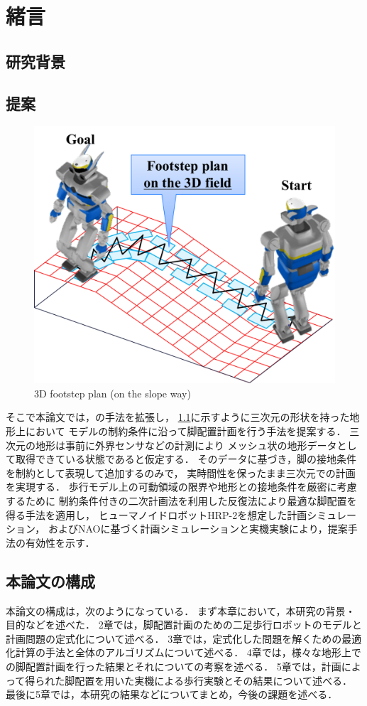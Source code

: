 \documentclass[autodetect-engine,dvipdfmx-if-dvi,ja=standard,a4j,jbase=11pt,magstyle=nomag*]{bxjsreport}
\begin{document}
\chapter{緒言}

\section{研究背景}




\section{提案}
\begin{figure}[t]
    \centering
    \includegraphics[width=0.8\linewidth, clip]{./figure/concept.pdf}
    \caption{3D footstep plan (on the slope way)}
    \label{fig:concept}
\end{figure}

そこで本論文では，\cite{yao_2011rs}の手法を拡張し，
\cref{fig:concept}に示すように三次元の形状を持った地形上において
モデルの制約条件に沿って脚配置計画を行う手法を提案する．
三次元の地形は事前に外界センサなどの計測により
メッシュ状の地形データとして取得できている状態であると仮定する．
そのデータに基づき，脚の接地条件を制約として表現して追加するのみで，
実時間性を保ったまま三次元での計画を実現する．
歩行モデル上の可動領域の限界や地形との接地条件を厳密に考慮するために
制約条件付きの二次計画法を利用した反復法により最適な脚配置を得る手法を適用し，
ヒューマノイドロボットHRP-2\cite{isozumi_2004jrsj}を想定した計画シミュレーション，
およびNAO\cite{mao_official}に基づく計画シミュレーションと実機実験により，提案手法の有効性を示す．


\section{本論文の構成}
本論文の構成は，次のようになっている．
まず本章において，本研究の背景・目的などを述べた．
2章では，脚配置計画のための二足歩行ロボットのモデルと計画問題の定式化について述べる．
3章では，定式化した問題を解くための最適化計算の手法と全体のアルゴリズムについて述べる．
4章では，様々な地形上での脚配置計画を行った結果とそれについての考察を述べる．
5章では，計画によって得られた脚配置を用いた実機による歩行実験とその結果について述べる．
最後に5章では，本研究の結果などについてまとめ，今後の課題を述べる．
\end{document}

